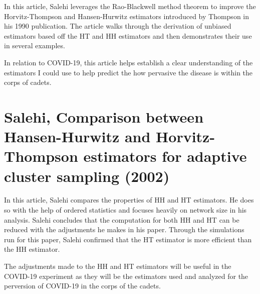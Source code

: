 \documentclass{article}
\begin{document}
In this article, Salehi leverages the Rao-Blackwell method theorem to improve the Horvitz-Thompson and Hansen-Hurwitz estimators introduced by Thompson in his 1990 publication. The article walks through the derivation of unbiased estimators based off the HT and HH estimators and then demonstrates their use in several examples. \cite{mohammad1999rao}

In relation to COVID-19, this article helps establish a clear understanding of the estimators I could use to help predict the how pervasive the disease is within the corps of cadets. 


\section{Salehi, Comparison between Hansen-Hurwitz and Horvitz-Thompson estimators for adaptive cluster sampling (2002)}
In this article, Salehi compares the properties of HH and HT estimators.  He does so with the help of ordered statistics and focuses heavily on network size in his analysis. Salehi concludes that the computation for both HH and HT can be reduced with the adjustments he makes in his paper. Through the simulations run for this paper, Salehi confirmed that the HT estimator is more efficient than the HH estimator. \cite{salehi2003comparison}

The adjustments made to the HH and HT estimators will be useful in the COVID-19 experiment as they will be the estimators used and analyzed for the perversion of COVID-19 in the corps of the cadets. 



\clearpage


\end{document}
